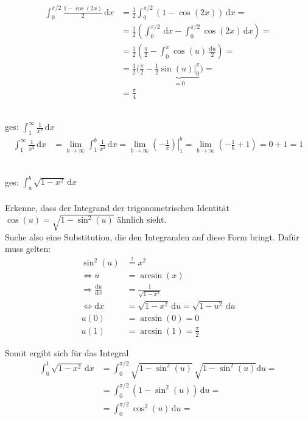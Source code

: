 \documentclass{article}
\newcommand{\diff}{\mathrm{d}}
\newcommand{\lr}[1]{\left(#1\right)}
\begin{document}
{\newpage


		\begin{align*}
			\int_0^{\pi/2} \frac{1 - \cos(2x)}{2} \, \diff x &= \frac{1}{2} \int_0^{\pi/2} \lr{ 1 - \cos(2x) } \, \diff x = \\
			&= \frac{1}{2} \lr{ \int_0^{\pi/2} \, \diff x - \int_0^{\pi/2} \cos(2x) \, \diff x } = \\
			&= \frac{1}{2} \lr{ \frac{\pi}{2} - \int_0^{\pi} \cos(u) \, \frac{\diff u}{2} } = \\
			&= \frac{1}{2} \Bigg( \frac{\pi}{2} - \frac{1}{2} \underbrace{ \left. \sin(u)\right|_0^\pi }_{=0} \Bigg) = \\
			&= \frac{\pi}{4}
		\end{align*}


	\\
	ges: $\int_1^\infty \frac{1}{x^2} \, \diff x$
		\begin{align*}
			\int_1^\infty \frac{1}{x^2} \, \diff x &= \lim\limits_{b\to\infty} \int_1^b \frac{1}{x^2} \, \diff x = \lim\limits_{b\to\infty} \left. \lr{ -\frac{1}{x} } \right|_1^b = \lim\limits_{b\to\infty} \lr{ -\frac{1}{b} + 1 } = 0 + 1 = 1
		\end{align*}


	\\
	ges: $\int_a^b \sqrt{1-x^2} \, \diff x$\\
	\\
	Erkenne, dass der Integrand der trigonometrischen Identität $\cos(u) = \sqrt{1 - \sin^2(u)}$ ähnlich sieht.\\
	Suche also eine Substitution, die den Integranden auf diese Form bringt. Dafür muss gelten:
		\begin{align*}
			\sin^2(u) &\stackrel{!}{=} x^2 \\
			\Leftrightarrow u &= \arcsin(x) \\
			\Rightarrow \frac{\diff u}{\diff x} &= \frac{1}{\sqrt{1 - x^2}} \\
			\Leftrightarrow \diff x &= \sqrt{1-x^2} \, \diff u = \sqrt{1-u^2} \, \diff u \\
			u(0) &= \arcsin(0) = 0 \\
			u(1) &= \arcsin(1) = \frac{\pi}{2}
		\end{align*}
	
	Somit ergibt sich für das Integral
		\begin{align*}
			\int_0^1 \sqrt{1-x^2} \, \diff x &= \int_0^{\pi/2} \sqrt{1-\sin^2(u)} \, \sqrt{1-\sin^2(u)} \diff u = \\
			 &= \int_0^{\pi/2} \lr{ 1 - \sin^2(u) } \, \diff u = \\
			 &= \int_0^{\pi/2} \cos^2(u) \, \diff u =
		\end{align*}
	
}
\end{document}
